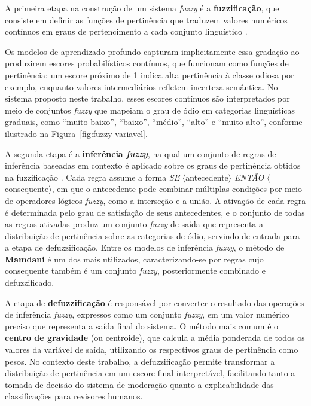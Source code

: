 A primeira etapa na construção de um sistema \textit{fuzzy} é a \textbf{fuzzificação}, que consiste em definir as funções de pertinência que traduzem valores numéricos contínuos em graus de pertencimento a cada conjunto linguístico \cite{ross2010}. 
 
Os modelos de aprendizado profundo capturam implicitamente essa gradação ao produzirem escores probabilísticos contínuos, que funcionam como funções de pertinência: um escore próximo de 1 indica alta pertinência à classe odiosa por exemplo, enquanto valores intermediários refletem incerteza semântica. No sistema proposto neste trabalho, esses escores contínuos são interpretados por meio de conjuntos \textit{fuzzy} que mapeiam o grau de ódio em categorias linguísticas graduais, como ``muito baixo'', ``baixo'', ``médio'', ``alto'' e ``muito alto'', conforme ilustrado na Figura~\ref{fig:fuzzy-variavel}.

A segunda etapa é a \textbf{inferência \textit{fuzzy}}, na qual um conjunto de regras de inferência baseadas em contexto é aplicado sobre os graus de pertinência obtidos na fuzzificação \cite{ross2010}. Cada regra assume a forma \textit{SE} $\langle$antecedente$\rangle$ \textit{ENTÃO} $\langle$consequente$\rangle$, em que o antecedente pode combinar múltiplas condições por meio de operadores lógicos \textit{fuzzy}, como a interseção e a união. A ativação de cada regra é determinada pelo grau de satisfação de seus antecedentes, e o conjunto de todas as regras ativadas produz um conjunto \textit{fuzzy} de saída que representa a distribuição de pertinência sobre as categorias de ódio, servindo de entrada para a etapa de defuzzificação. Entre os modelos de inferência \textit{fuzzy}, o método de \textbf{Mamdani} \cite{mamdani1975} é um dos mais utilizados, caracterizando-se por regras cujo consequente também é um conjunto \textit{fuzzy}, posteriormente combinado e defuzzificado.

A etapa de \textbf{defuzzificação} \cite{Klir1995} é responsável por converter o resultado das operações de inferência \textit{fuzzy}, expressos como um conjunto \textit{fuzzy}, em um valor numérico preciso que representa a saída final do sistema. O método mais comum é o \textbf{centro de gravidade} (ou centroide), que calcula a média ponderada de todos os valores da variável de saída, utilizando os respectivos graus de pertinência como pesos. No contexto deste trabalho, a defuzzificação permite transformar a distribuição de pertinência em um escore final interpretável, facilitando tanto a tomada de decisão do sistema de moderação quanto a explicabilidade das classificações para revisores humanos.

